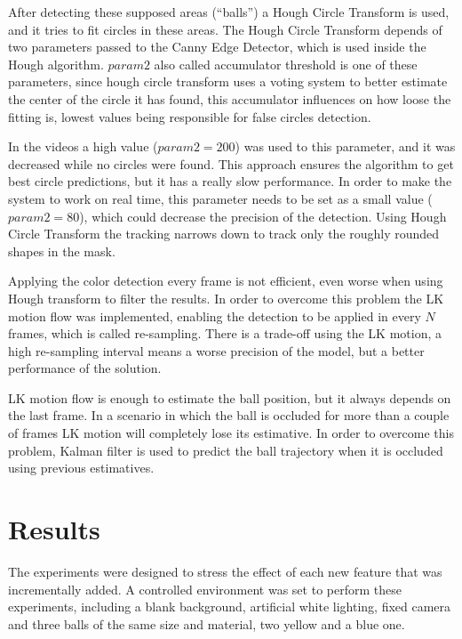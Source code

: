 \documentclass[10pt,twocolumn,letterpaper]{article}
\begin{document}
After detecting these supposed areas (``balls'') a Hough Circle Transform  is
used, and it tries to fit circles in these areas. The Hough Circle Transform
depends of two parameters passed to the Canny Edge Detector, which is used
inside the Hough algorithm. $param2$ also called accumulator threshold is one of
these parameters, since hough circle transform uses a voting system to better
estimate the center of the circle it has found, this accumulator influences on
how loose the fitting is, lowest values being responsible for false circles
detection.

In the videos a high value ($param2 = 200$) was used to this parameter, and it was decreased while no circles were found. This approach ensures the algorithm to get best circle predictions, but it has a really slow performance. In order to make the system to work on real time, this parameter needs to be set as a small value ($param2 = 80$), which could decrease the precision of the detection. Using Hough Circle Transform the tracking narrows down to track only the roughly rounded shapes in the mask.

Applying the color detection every frame is not efficient, even worse when using
Hough transform to filter the results. In order to overcome this problem the LK
motion flow was implemented, enabling the detection to be applied  in every $N$
frames, which is called re-sampling. There is a trade-off using the LK motion,
a high re-sampling interval means a worse precision of the model, but a better
performance of the solution.

LK motion flow is enough to estimate the ball position, but it always depends on
the last frame. In a scenario in which the ball is occluded for more than a
couple of frames  LK motion will completely lose its estimative. In order to
overcome this problem, Kalman filter is used to predict the ball trajectory
when it is occluded using previous estimatives.

\section{Results}\label{sec:result}

The experiments were designed to stress the effect of each new feature that was incrementally added. A controlled environment was set to perform these
experiments, including a blank background, artificial white lighting, fixed
camera and three balls of the same size and material, two yellow and a blue
one.
\end{document}

